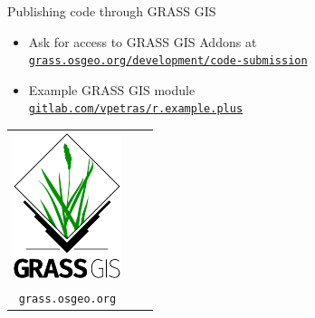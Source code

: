 \documentclass[xcolor={dvipsnames,usenames},beamer,aspectratio=169]{beamer}
\begin{document}
\begin{frame}{Publishing code through GRASS GIS}

\begin{block}{}
 \begin{itemize}
  \item Ask for access to GRASS GIS Addons at
        \\
        \href{https://grass.osgeo.org/development/code-submission/}{\texttt{grass.osgeo.org/development/code-submission}}
  \item Example GRASS GIS module
        \\
        \href{https://gitlab.com/vpetras/r.example.plus/}{\texttt{gitlab.com/vpetras/r.example.plus}}
 \end{itemize}
\end{block}

\bigskip
\centering

\begin{tabular}{clc}
\begin{minipage}{0.16\textwidth}
\includegraphics[width=\textwidth]{grass_gis}
\end{minipage}
&
\begin{minipage}{0.5\textwidth}
\footnotesize
\href{https://grass.osgeo.org}{%
Get GRASS GIS at\\
\texttt{grass.osgeo.org}%
}


\end{minipage}
\end{tabular}
\end{frame}
\end{document}
